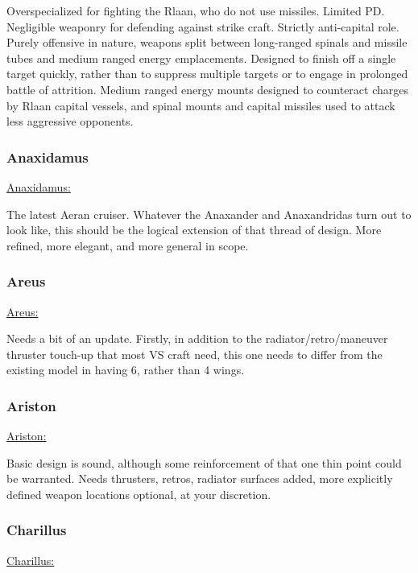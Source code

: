 Overspecialized for fighting the Rlaan, who do not use
missiles. Limited PD. Negligible weaponry for defending against strike
craft. Strictly anti-capital role. Purely offensive in nature, weapons
split between long-ranged spinals and missile tubes and medium ranged
energy emplacements. Designed to finish off a single target quickly,
rather than to suppress multiple targets or to engage in prolonged
battle of attrition. Medium ranged energy mounts designed to
counteract charges by Rlaan capital vessels, and spinal mounts and
capital missiles used to attack less aggressive opponents.


\subsubsection{Anaxidamus}
\href{http://vegastrike.sourceforge.net/wiki/Vessel:Anaxidamus}{Anaxidamus:}

The latest Aeran cruiser. Whatever the Anaxander and Anaxandridas turn
out to look like, this should be the logical extension of that thread
of design. More refined, more elegant, and more general in scope.


\subsubsection{Areus}
\href{http://vegastrike.sourceforge.net/wiki/Vessel:Areus}{Areus:}

Needs a bit of an update. Firstly, in addition to the
radiator/retro/maneuver thruster touch-up that most VS craft need, this
one needs to differ from the existing model in having 6, rather than 4
wings.



\subsubsection{Ariston}
\href{http://vegastrike.sourceforge.net/wiki/Vessel:Ariston}{Ariston:}

Basic design is sound, although some reinforcement of that one thin
point could be warranted. Needs thrusters, retros, radiator surfaces
added, more explicitly defined weapon locations optional, at your
discretion.


\subsubsection{Charillus}
\href{http://vegastrike.sourceforge.net/wiki/Vessel:Charillus}{Charillus:}

